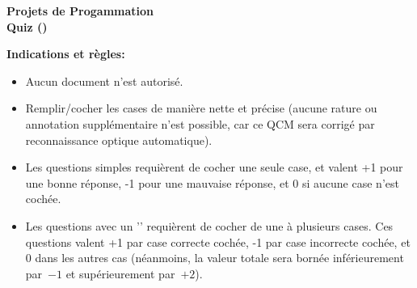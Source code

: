 \documentclass[a4paper]{article}
\begin{document}
\begin{examcopy}[125]

  \begin{minipage}{.4\linewidth}
    \centering\large\bf Projets de Progammation\\ Quiz (\examtopic)
  \end{minipage}
\noindent{}


  \medskip
  \begin{minipage}{\textwidth}
    \textbf{Indications et règles:}

    \begin{itemize}
      \item Aucun document n'est autorisé.

      \item Remplir/cocher les cases de manière nette et précise (aucune rature ou annotation supplémentaire n'est possible, car ce QCM sera corrigé par reconnaissance optique automatique).

      \item Les questions simples requièrent de cocher une seule case, et valent +1 pour une bonne réponse, -1 pour une mauvaise réponse, et 0 si aucune case n'est cochée.

      \item Les questions avec un '\multiSymbole{}' requièrent de cocher de une à plusieurs cases. Ces questions valent +1 par case correcte cochée, -1 par case incorrecte cochée, et 0 dans les autres cas (néanmoins, la valeur totale sera bornée inférieurement par~$-1$ et supérieurement par~$+2$).
    \end{itemize}
  \end{minipage}


\end{examcopy}
\end{document}
